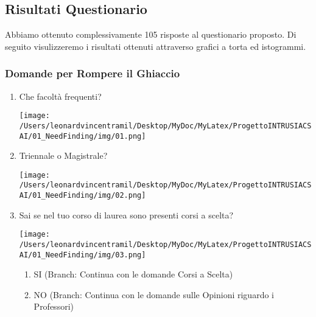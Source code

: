 \subsection{Risultati Questionario}
Abbiamo ottenuto complessivamente 105 risposte al questionario proposto.
Di seguito visulizzeremo i risultati ottenuti attraverso grafici a torta ed istogrammi.

\subsubsection{Domande per Rompere il Ghiaccio}
\begin{enumerate}
    \item Che facoltà frequenti?
    \begin{center}
        \texttt{[image: /Users/leonardvincentramil/Desktop/MyDoc/MyLatex/ProgettoINTRUSIACSAI/01\_NeedFinding/img/01.png]}
    \end{center}    

    \item Triennale o Magistrale?
    \begin{center}
        \texttt{[image: /Users/leonardvincentramil/Desktop/MyDoc/MyLatex/ProgettoINTRUSIACSAI/01\_NeedFinding/img/02.png]}
    \end{center}
    \item Sai se nel tuo corso di laurea sono presenti corsi a scelta?
    \begin{center}
        \texttt{[image: /Users/leonardvincentramil/Desktop/MyDoc/MyLatex/ProgettoINTRUSIACSAI/01\_NeedFinding/img/03.png]}
    \end{center}   
    \begin{enumerate}
        \item SI (Branch: Continua con le domande Corsi a Scelta)
        \item NO (Branch: Continua con le domande sulle Opinioni riguardo i Professori)
    \end{enumerate}
\end{enumerate}

